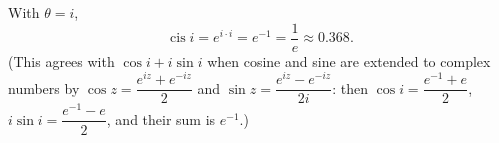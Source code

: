 With $\theta=i$,
\[\operatorname{cis} i=e^{i\cdot i}=e^{-1}=\boxed{\dfrac1e}\approx0.368.\]
(This agrees with $\cos i+i\sin i$ when cosine and sine are extended to complex numbers by $\cos z=\dfrac{e^{iz}+e^{-iz}}{2}$ and $\sin z=\dfrac{e^{iz}-e^{-iz}}{2i}$: then $\cos i=\dfrac{e^{-1}+e}{2}$, $i\sin i=\dfrac{e^{-1}-e}{2}$, and their sum is $e^{-1}$.)
